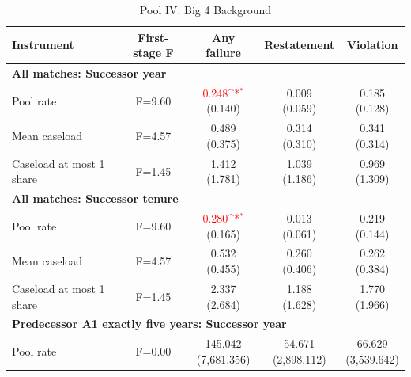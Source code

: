 \begin{table}[htbp]
\footnotesize
\def\sym#1{\ifmmode^{#1}\else\(^{#1}\)\fi}
\centering
\caption{Pool IV: Big 4 Background}
\begin{threeparttable}
\begin{tabular}{p{}cccc}
\toprule
Instrument & First-stage F & Any failure & Restatement & Violation \\
\midrule
\multicolumn{5}{l}{\textbf{All matches: Successor year}} \\
Pool rate & F=9.60 & \shortstack{\textcolor{red}{0.248\sym{*}}\\(0.140)} & \shortstack{0.009\\(0.059)} & \shortstack{0.185\\(0.128)} \\
Mean caseload & F=4.57 & \shortstack{0.489\\(0.375)} & \shortstack{0.314\\(0.310)} & \shortstack{0.341\\(0.314)} \\
Caseload at most 1 share & F=1.45 & \shortstack{1.412\\(1.781)} & \shortstack{1.039\\(1.186)} & \shortstack{0.969\\(1.309)} \\
\multicolumn{5}{l}{\textbf{All matches: Successor tenure}} \\
Pool rate & F=9.60 & \shortstack{\textcolor{red}{0.280\sym{*}}\\(0.165)} & \shortstack{0.013\\(0.061)} & \shortstack{0.219\\(0.144)} \\
Mean caseload & F=4.57 & \shortstack{0.532\\(0.455)} & \shortstack{0.260\\(0.406)} & \shortstack{0.262\\(0.384)} \\
Caseload at most 1 share & F=1.45 & \shortstack{2.337\\(2.684)} & \shortstack{1.188\\(1.628)} & \shortstack{1.770\\(1.966)} \\
\multicolumn{5}{l}{\textbf{Predecessor A1 exactly five years: Successor year}} \\
Pool rate & F=0.00 & \shortstack{145.042\\(7,681.356)} & \shortstack{54.671\\(2,898.112)} & \shortstack{66.629\\(3,539.642)} \\

\end{tabular}
\end{threeparttable}
\end{table}
